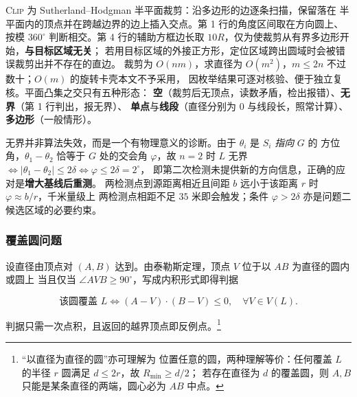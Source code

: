 \documentclass[withoutpreface, bwprint]{cumcmthesis}
\begin{document}
\textsc{Clip} 为 Sutherland--Hodgman 半平面裁剪\cite{sh}：沿多边形的边逐条扫描，保留落在
半平面内的顶点并在跨越边界的边上插入交点。第 1 行的角度区间取在方向圆上、按模 $360^\circ$
判断相交。第 4 行的辅助方框边长取 $10R$，仅为使裁剪从有界多边形开始，\textbf{与目标区域无关}；
若用目标区域的外接正方形，定位区域跨出圆域时会被错误裁剪出并不存在的直边。
裁剪为 $O(nm)$，求直径为 $O(m^2)$，$m\le 2n$ 不过数十；$O(m)$ 的旋转卡壳本文不予采用，
因枚举结果可逐对核验、便于独立复核。平面凸集之交只有五种形态：
\textbf{空}（裁剪后无顶点，读数矛盾，检出报错）、\textbf{无界}（第 1 行判出，报无界）、
\textbf{单点}与\textbf{线段}（直径分别为 $0$ 与线段长，照常计算）、\textbf{多边形}（一般情形）。

无界并非算法失效，而是一个有物理意义的诊断。由于 $\theta_i$ 是 $S_i$ \emph{指向} $G$ 的
方位角，$\theta_1-\theta_2$ 恰等于 $G$ 处的交会角 $\varphi$，故 $n=2$ 时
$L$ 无界 $\iff|\theta_1-\theta_2|\le2\delta\iff\varphi\le2\delta=2^\circ$，
即第二次检测未提供新的方向信息，正确的应对是\textbf{增大基线后重测}。
两检测点到源距离相近且间距 $b$ 远小于该距离 $r$ 时 $\varphi\approx b/r$，千米量级上
两检测点相距不足 $35$ 米即会触发；条件 $\varphi>2\delta$ 亦是问题二候选区域的必要约束。

\subsubsection{覆盖圆问题}
\label{sec:cover}

设直径由顶点对 $(A,B)$ 达到。由泰勒斯定理，顶点 $V$ 位于以 $AB$ 为直径的圆内或圆上
当且仅当 $\angle AVB\ge 90^\circ$，写成内积形式即得判据

\begin{equation}
  \label{eq:criterion}
  \text{该圆覆盖 }L\iff (A-V)\cdot(B-V)\le 0,\quad \forall V\in V(L).
\end{equation}

判据只需一次点积，且返回的越界顶点即反例点。\footnote{“以直径为直径的圆”亦可理解为
位置任意的圆，两种理解等价：任何覆盖 $L$ 的半径 $r$ 圆满足 $d\le 2r$，故 $R_{\min}\ge d/2$；
若存在直径为 $d$ 的覆盖圆，则 $A,B$ 只能是某条直径的两端，圆心必为 $AB$ 中点。}
\end{document}
